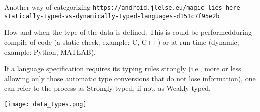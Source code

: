 \documentclass[11pt,titlepage,fleqn]{article}
\begin{document}
\begin{section}{Another way of categorizing}
\verb+https://android.jlelse.eu/magic-lies-here-statically-typed-vs-dynamically-typed-languages-d151c7f95e2b+

How and when the type of the data is defined. This is could be performedduring compile of code (a static check; example: C, C++) or at run-time (dynamic, example: Python, MATLAB). 

If a language specification requires its typing rules strongly (i.e., more or less allowing only those automatic type conversions that do not lose information), one can refer to the process as Strongly typed, if not, as Weakly typed.

\texttt{[image: data\_types.png]}
\end{section}
\end{document}
